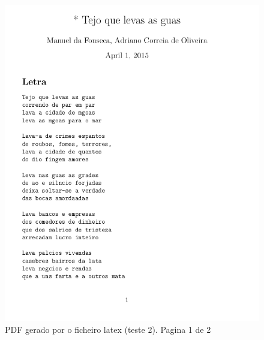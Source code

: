 \begin{figure}
\centering
\includegraphics[width=15cm]{anexos/2-5-b-img.png}
\caption{PDF gerado por o ficheiro latex (teste 2). Pagina 1 de 2}
\label{fig::anex-music-test-img02}
\end{figure}

